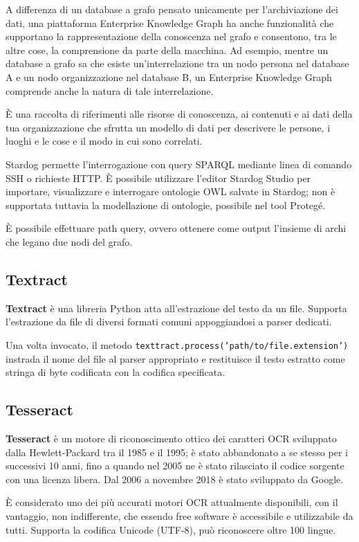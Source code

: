 A differenza di un database a grafo pensato unicamente per l'archiviazione dei dati, una piattaforma Enterprise Knowledge Graph ha anche funzionalità che supportano la rappresentazione della conoscenza nel grafo e consentono, tra le altre cose, la comprensione da parte della macchina. Ad esempio, mentre un database a grafo sa che esiste un'interrelazione tra un nodo persona nel database A e un nodo organizzazione nel database B, un Enterprise Knowledge Graph comprende anche la natura di tale interrelazione. 

È una raccolta di riferimenti alle risorse di conoscenza, ai contenuti e ai dati della tua organizzazione che sfrutta un modello di dati per descrivere le persone, i luoghi e le cose e il modo in cui sono correlati.

Stardog permette l'interrogazione con query SPARQL mediante linea di comando SSH o richieste HTTP. È possibile utilizzare l'editor Stardog Studio per importare, visualizzare e interrogare ontologie OWL salvate in Stardog; non è supportata tuttavia la modellazione di ontologie, possibile nel tool Protegé. 

È possibile effettuare path query, ovvero ottenere come output l'insieme di archi che legano due nodi del grafo\cite{stardog}.

\subsection{Textract}
\textbf{Textract} è una libreria Python atta all'estrazione del testo da un file. Supporta l'estrazione da file di diversi formati comuni appoggiandosi a parser dedicati.

Una volta invocato, il metodo \texttt{texttract.process('path/to/file.extension')} instrada il nome del file al parser appropriato e restituisce il testo estratto come stringa di byte codificata con la codifica specificata.\cite{textract}

\subsection{Tesseract}
\textbf{Tesseract} è un motore di riconoscimento ottico dei caratteri OCR sviluppato dalla Hewlett-Packard tra il 1985 e il 1995; è stato abbandonato a se stesso per i successivi 10 anni, fino a quando nel 2005 ne è stato rilasciato il codice
sorgente con una licenza libera. Dal 2006 a novembre 2018 è stato sviluppato da Google.

È considerato uno dei più accurati motori OCR attualmente disponibili, con il vantaggio, non indifferente, che essendo free software è accessibile e utilizzabile da tutti.
Supporta la codifica Unicode (UTF-8), può riconoscere oltre 100 lingue.

